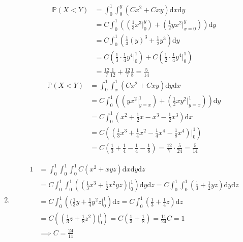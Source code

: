 \begin{enumerate}[label=\alph*.]
\begin{align*}
\mathbb{P}(X < Y) &= \int_0^1 \int_0^y (Cx^2 + Cxy) \mathrm d x \mathrm d y \\
&= C \int_0^1 \left( \left( \frac{1}{3}x^3 \Big|_0^y \right) + \left( \frac{1}{2} y x^2 \Big|_{x=0}^y \right) \right) \mathrm d y \\
&= C \int_0^1 \left( \frac{1}{3} (y)^3 + \frac{1}{2} y^3 \right) \mathrm d y \\
&= C \left(\frac{1}{3}\cdot\frac{1}{4} y^4 \Big|_0^1 \right) + C \left(\frac{1}{2}\cdot\frac{1}{4} y^4 \Big|_0^1 \right) \\
&= \frac{12}{7} \frac{1}{12} + \frac{12}{7} \frac{1}{8} = \frac{5}{14}
\end{align*}
\begin{align*}
\mathbb{P}(X < Y) &= \int_0^1 \int_x^1 \left( C x^2 + C xy \right) \mathrm dy \mathrm dx \\
&= C \int_0^1 \left( \left( yx^2 \Big|_{y=x}^1 \right) + \left(\frac{1}{2} xy^2 \Big|_{y=x}^1 \right) \right) \mathrm d y \\
&= C \int_0^1 \left( x^2 + \frac{1}{2} x - x^3 - \frac{1}{2} x^3 \right) \mathrm d x \\
&= C \left( ( \frac{1}{3}x^3 + \frac{1}{4}x^2 - \frac{1}{4}x^4 - \frac{1}{8}x^4) \Big|_0^1 \right) \\
&= C \left( \frac{1}{3} + \frac{1}{4} - \frac{1}{4} - \frac{1}{8} \right) = \frac{12}{7} \cdot \frac{5}{24} = \frac{5}{14} 
\end{align*}
\item

\begin{align*}
1 &= \int_0^1 \int_0^1 \int_0^1 C \left(x^2 + xyz \right) \mathrm d x \mathrm d y \mathrm d z \\
&= C \int_0^1 \int_0^1 \left( (\frac{1}{3}x^3 + \frac{1}{2}x^2 yz) \Big|_0^1 \right) \mathrm d y \mathrm d z 
= C \int_0^1 \int_0^1 \left( \frac{1}{3} + \frac{1}{2} yz \right) \mathrm d y \mathrm d z \\
&= C \int_0^1 \left( (\frac{1}{3}y + \frac{1}{4} y^2 z \Big|_0^1 \right) \mathrm d z
= C \int_0^1 \left( \frac{1}{3} + \frac{1}{4} z \right) \mathrm d z \\
&= C \left( (\frac{1}{3} z + \frac{1}{8} z^2 ) \Big|_0^1 \right)
= C \left( \frac{1}{3} + \frac{1}{8} \right) = \frac{11}{24} C = 1 \\
&\implies C = \frac{24}{11}
\end{align*}
\end{enumerate}

